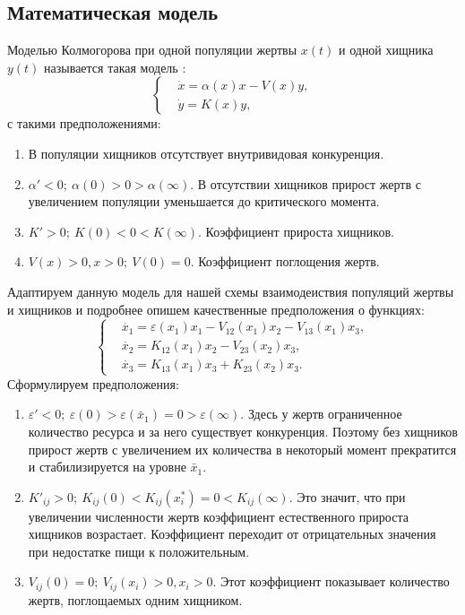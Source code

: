 \subsection{Математическая модель}
    Моделью Колмогорова при одной популяции жертвы \(x (t)\) и одной хищника \(y (t)\) называется такая модель \cite{svilog}:
    \[
        \left\{\begin{split}
            & \dot{x} = \alpha(x)x - V(x) y, \\
            & \dot{y} = K(x) y,
        \end{split}\right.
    \]
    с такими предположениями:
    
    \begin{enumerate}
        \item В популяции хищников отсутствует внутривидовая конкуренция.
        \item \( \alpha' < 0; ~ \alpha(0) > 0 > \alpha(\infty) \). В отсутствии хищников прирост жертв с увеличением популяции уменьшается до критического момента.
        \item \( K' > 0; ~ K(0) < 0 < K(\infty) \). Коэффициент прироста хищников.
        \item \( V(x) > 0, x > 0; ~ V(0) = 0 \). Коэффициент поглощения жертв.
    \end{enumerate}

    Адаптируем данную модель для нашей схемы взаимодеиствия популяций жертвы и хищников и подробнее опишем качественные предположения о функциях:
    \[
        \left\{\begin{split}
            & \dot{x_1} = \varepsilon(x_1)x_1 - V_{12}(x_1)x_2 - V_{13}(x_1)x_3, \\
            & \dot{x_2} = K_{12}(x_1)x_2 - V_{23}(x_2)x_3, \\
            & \dot{x_3} = K_{13}(x_1)x_3 + K_{23}(x_2)x_3. 
        \end{split}\right.
    \]
    Сформулируем предположения:
    \begin{enumerate}
        \item \( \varepsilon' < 0; ~ \varepsilon(0) > \varepsilon(\bar{x}_1) = 0 > \varepsilon(\infty)\). Здесь у жертв ограниченное количество ресурса и за него существует конкуренция. Поэтому без хищников прирост жертв с увеличением их количества в некоторый момент прекратится и стабилизируется на уровне \( \bar{x}_1 \).
        \item \( K'_{ij} > 0; ~ K_{ij}(0) < K_{ij}(x_i^*) = 0 < K_{ij} (\infty) \). Это значит, что при увеличении численности жертв коэффициент естественного прироста хищников возрастает. Коэффициент переходит от отрицательных значения при недостатке пищи к положительным.
        \item \( V_{ij}(0) = 0; ~ V_{ij} (x_i) > 0, x_i > 0 \). Этот коэффициент показывает количество жертв, поглощаемых одним хищником.
    \end{enumerate}


